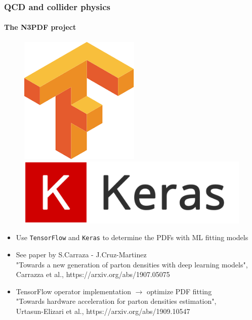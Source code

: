 \documentclass[aspectratio=43]{beamer}
\begin{document}
\begin{frame}
	
	\frametitle{QCD and collider physics}
	\framesubtitle{The N3PDF project}
	
	\footnotesize
	
	\begin{figure}[!htb]
		\includegraphics[width = 0.5\linewidth]{plots/backup/TF.png}
		\endminipage\hfill
		\includegraphics[width = 0.5\linewidth]{plots/backup/Keras.png}
		\endminipage\hfill
	\end{figure}
	
	\begin{itemize}
		\item Use \texttt{TensorFlow} and \texttt{Keras} to determine the PDFs with ML fitting models
		\item See paper by S.Carraza - J.Cruz-Martinez \\
		{\color{blue}"Towards a new generation of parton densities with deep learning models",\\
		Carrazza et al., https://arxiv.org/abs/1907.05075}
		\item TensorFlow operator implementation $\longrightarrow$ optimize PDF fitting \\
		{\color{blue}"Towards hardware acceleration for parton densities estimation",\\ Urtasun-Elizari et al., https://arxiv.org/abs/1909.10547}
	\end{itemize}

\end{frame}
\end{document}
